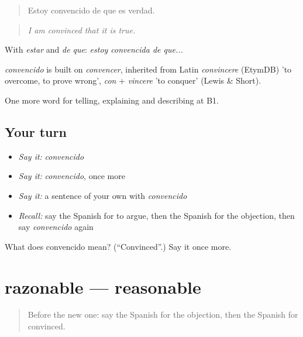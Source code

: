 \begin{quote}
Estoy convencido de que es verdad.
\end{quote}

\begin{quote}
\emph{I am convinced that it is true.}
\end{quote}

With \emph{estar} and \emph{de que}: \emph{estoy convencida de que...}

\begin{cousinweb}
\emph{convencido} is built on \emph{convencer}, inherited from Latin \emph{convincere} (EtymDB) 'to overcome, to prove wrong', \emph{con} + \emph{vincere} 'to conquer' (Lewis \& Short).
\end{cousinweb}

\begin{grammarlens}[title={What you've built}]
One more word for telling, explaining and describing at B1.
\end{grammarlens}

\subsection*{Your turn}
\begin{itemize}
\raggedright
  \item \emph{Say it:} \emph{convencido}
  \item \emph{Say it:} \emph{convencido}, once more
  \item \emph{Say it:} a sentence of your own with \emph{convencido}
  \item \emph{Recall:} say the Spanish for to argue, then the Spanish for the objection, then say \emph{convencido} again
\end{itemize}

\begin{tcolorbox}[breakable,colback=teal!4,colframe=teal!35!black,title={Before you move on}]
What does convencido mean? (\textquotedblleft{}Convinced\textquotedblright{}.) Say it once more.
\end{tcolorbox}
\section[razonable]{razonable — reasonable}

\label{lesson:ES-C577-razonable}



\begin{quote}
Before the new one: say the Spanish for the objection, then the Spanish for convinced.
\end{quote}

